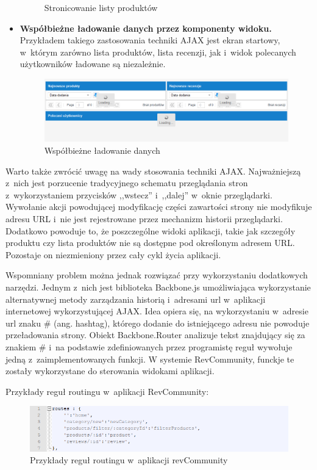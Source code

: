 \begin{itemize}
\begin{figure}[H]
	\caption{Stronicowanie listy produktów}
\end{figure}
\item\textbf{Współbieżne ładowanie danych przez komponenty widoku.} Przykładem takiego zastosowania techniki AJAX jest ekran startowy, w~którym zarówno lista produktów, lista recenzji, jak i~widok polecanych użytkowników ładowane są niezależnie.
\begin{figure}[H]
	\centering
	\includegraphics[width=\textwidth]{images/Loading.png}
	\caption{Współbieżne ładowanie danych}
\end{figure}
\end{itemize}


Warto także zwrócić uwagę na wady stosowania techniki AJAX. Najważniejszą z~nich jest porzucenie tradycyjnego schematu przeglądania stron z~wykorzystaniem przycisków ,,wstecz'' i~,,dalej'' w~oknie przeglądarki. Wywołanie akcji powodującej modyfikację części zawartości strony nie modyfikuje adresu URL i~nie jest rejestrowane przez mechanizm historii przeglądarki. Dodatkowo powoduje to, że poszczególne widoki aplikacji, takie jak szczegóły produktu czy lista produktów nie są dostępne pod określonym adresem URL. Pozostaje on niezmieniony przez cały cykl życia aplikacji.\cite{jsadv}

Wspomniany problem można jednak rozwiązać przy wykorzystaniu dodatkowych narzędzi. Jednym z~nich jest biblioteka Backbone.js umożliwiająca wykorzystanie alternatywnej metody zarządzania historią i~adresami url w~aplikacji internetowej wykorzystującej AJAX. Idea opiera się, na wykorzystaniu w~adresie url znaku \# (ang. hashtag), którego dodanie do istniejącego adresu nie powoduje przeładowania strony.\cite{urls} Obiekt Backbone.Router analizuje tekst znajdujący się za znakiem \# i~na podstawie zdefiniowanych przez programistę reguł wywołuje jedną z~zaimplementowanych funkcji. W systemie RevCommunity, funckje te zostały wykorzystane do sterowania widokami aplikacji.\cite{backbone}

Przykłady reguł routingu w~aplikacji RevCommunity:

\begin{figure}[H]
	\centering
	\includegraphics[width=\textwidth]{images/routes.png}
	\caption{Przykłady reguł routingu w~aplikacji revCommunity}
\end{figure}

